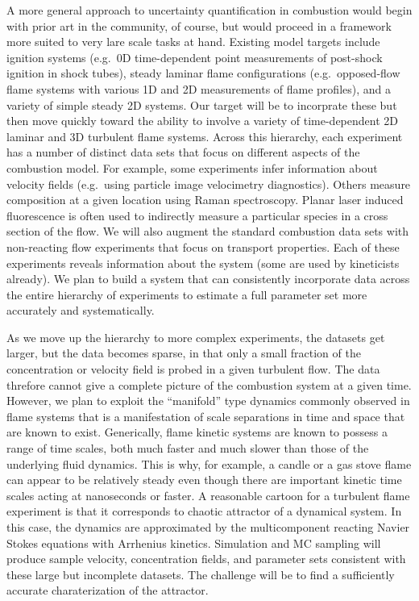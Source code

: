 \documentclass[11pt]{article}
\begin{document}
A more general approach to uncertainty quantification in combustion
would begin with prior art in the community, of course, but would
proceed in a framework more suited to very lare scale tasks at hand.
Existing model targets include ignition systems (e.g.\ 0D
time-dependent point measurements of post-shock ignition in shock
tubes), steady laminar flame configurations (e.g.\ opposed-flow flame
systems with various 1D and 2D measurements of flame profiles), and a
variety of simple steady 2D systems.  Our target will be to incorprate
these but then move quickly toward the ability to involve a variety of
time-dependent 2D laminar and 3D turbulent flame systems.  Across this
hierarchy, each experiment has a number of distinct data sets that
focus on different aspects of the combustion model.  For example, some
experiments infer information about velocity fields (e.g.\ using
particle image velocimetry diagnostics). Others measure composition at
a given location using Raman spectroscopy. Planar laser induced
fluorescence is often used to indirectly measure a particular species
in a cross section of the flow.  We will also augment the standard
combustion data sets with non-reacting flow experiments that focus on
transport properties.  Each of these experiments reveals information
about the system (some are used by kineticists already).  We plan to
build a system that can consistently incorporate data across the
entire hierarchy of experiments to estimate a full parameter set more
accurately and systematically.

As we move up the hierarchy to more complex experiments, the datasets
get larger, but the data becomes sparse, in that only a small fraction
of the concentration or velocity field is probed in a given turbulent
flow.  The data threfore cannot give a complete picture of the
combustion system at a given time.  However, we plan to exploit the
``manifold'' type dynamics commonly observed in flame systems that is
a manifestation of scale separations in time and space that are known
to exist.  Generically, flame kinetic systems are known to possess a
range of time scales, both much faster and much slower than those of
the underlying fluid dynamics.  This is why, for example, a candle or
a gas stove flame can appear to be relatively steady even though there
are important kinetic time scales acting at nanoseconds or faster.  A
reasonable cartoon for a turbulent flame experiment is that it
corresponds to chaotic attractor of a dynamical system.  In this case,
the dynamics are approximated by the multicomponent reacting Navier
Stokes equations with Arrhenius kinetics.  Simulation and MC sampling
will produce sample velocity, concentration fields, and parameter sets
consistent with these large but incomplete datasets.  The challenge
will be to find a sufficiently accurate charaterization of the
attractor.
\end{document}
